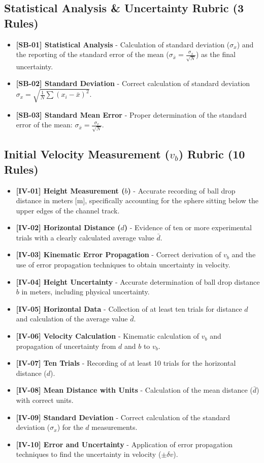 \documentclass{article}
\begin{document}
\subsection*{Statistical Analysis \& Uncertainty Rubric (3 Rules)}
\begin{itemize}
\item \textbf{ [SB-01] Statistical Analysis } - Calculation of standard deviation ($\sigma_x$) and the reporting of the standard error of the mean ($\sigma_{\bar{x}} = \frac{\sigma_x}{\sqrt{N}}$) as the final uncertainty.
\item \textbf{ [SB-02] Standard Deviation } - Correct calculation of standard deviation $\sigma_x = \sqrt{\frac{1}{N} \sum (x_i - \bar{x})^2}$.
\item \textbf{ [SB-03] Standard Mean Error } -  Proper determination of the standard error of the mean: $\sigma_{\bar{x}} = \frac{\sigma_x}{\sqrt{N}}$.
\end{itemize}

\subsection*{Initial Velocity Measurement ($v_b$) Rubric (10 Rules)}
\begin{itemize}
\item \textbf{ [IV-01] Height Measurement ($b$) } - Accurate recording of ball drop distance in meters [m], specifically accounting for the sphere sitting below the upper edges of the channel track.
\item \textbf{ [IV-02] Horizontal Distance ($d$) } - Evidence of ten or more experimental trials with a clearly calculated average value $\bar{d}$.
\item \textbf{ [IV-03] Kinematic Error Propagation } - Correct derivation of $v_b$ and the use of error propagation techniques to obtain uncertainty in velocity.
\item \textbf{ [IV-04] Height Uncertainty } - Accurate determination of ball drop distance $b$ in meters, including physical uncertainty.
\item \textbf{ [IV-05] Horizontal Data } - Collection of at least ten trials for distance $d$ and calculation of the average value $\bar{d}$.
\item \textbf{ [IV-06] Velocity Calculation } - Kinematic calculation of $v_b$ and propagation of uncertainty from $d$ and $b$ to $v_b$.
\item \textbf{ [IV-07] Ten Trials} - Recording of at least 10 trials for the horizontal distance ($d$).
\item \textbf{ [IV-08] Mean Distance with Units } - Calculation of the mean distance ($\bar{d}$) with correct units.
\item \textbf{ [IV-09] Standard Deviation } - Correct calculation of the standard deviation ($\sigma_x$) for the $d$ measurements.
\item \textbf{ [IV-10] Error and Uncertainty } - Application of error propagation techniques to find the uncertainty in velocity ($\pm \delta v$).
\end{itemize}
\end{document}
